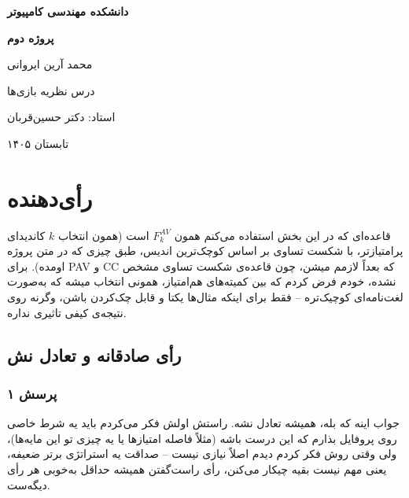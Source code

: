 \documentclass[12pt, a4paper]{article}
\begin{document}
\begin{titlepage}
    \centering
    {\large \textbf{دانشکده مهندسی کامپیوتر} \par}
    \vspace{2.5cm}
    {\Huge \textbf{پروژه دوم} \par}
    \vspace{2.5cm}
    {\Large محمد آرین ایروانی \par}
    \vspace{0.5cm}
    
    \vspace{3cm}
    {\Large درس نظریه بازی‌ها \par}
    \vspace{0.5cm}
    {\Large استاد: دکتر حسین‌قربان \par}
    \vspace{0cm}
    \vfill
    {\Large تابستان ۱۴۰۵ \par}
\end{titlepage}
\newpage
\tableofcontents
\newpage

\section{رأی‌دهنده}

قاعده‌ای که در این بخش استفاده می‌کنم همون $F_k^{AV}$ است (همون انتخاب $k$ کاندیدای پرامتیازتر، با شکست تساوی بر اساس کوچک‌ترین اندیس، طبق چیزی که در متن پروژه اومده). برای PAV و CC که بعداً لازمم میشن، چون قاعده‌ی شکست تساوی مشخص نشده، خودم فرض کردم که بین کمیته‌های هم‌امتیاز، همونی انتخاب میشه که به‌صورت لغت‌نامه‌ای کوچیک‌تره -- فقط برای اینکه مثال‌ها یکتا و قابل چک‌کردن باشن، وگرنه روی نتیجه‌ی کیفی تاثیری نداره.

\subsection{رأی صادقانه و تعادل نش}

\subsubsection*{پرسش ۱}

جواب اینه که بله، همیشه تعادل نشه. راستش اولش فکر می‌کردم باید یه شرط خاصی روی پروفایل بذارم که این درست باشه (مثلاً فاصله امتیازها یا یه چیزی تو این مایه‌ها)، ولی وقتی روش فکر کردم دیدم اصلاً نیازی نیست -- صداقت یه استراتژی برتر ضعیفه، یعنی مهم نیست بقیه چیکار می‌کنن، رأی راست‌گفتن همیشه حداقل به‌خوبی هر رأی دیگه‌ست.
\end{document}
